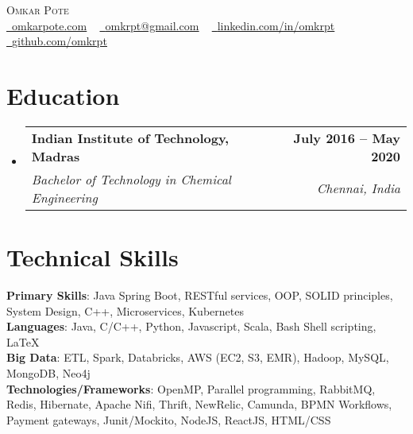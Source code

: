 \documentclass[letterpaper,11pt]{article}
\makeatletter
\newcommand{\resumeSubheading}[4]{
  \vspace{-2pt}\item
    \begin{tabular*}{1.0\textwidth}[t]{l@{\extracolsep{\fill}}r}
      \textbf{#1} & \textbf{\small #2} \\
      \textit{\small#3} & \textit{\small #4} \\
    \end{tabular*}\vspace{-7pt}
}
\newcommand{\resumeSubHeadingListStart}{\begin{itemize}[leftmargin=0.0in, label={}]}
\newcommand{\resumeSubHeadingListEnd}{\end{itemize}}
\makeatother
\begin{document}

\begin{center}
    {\vspace*{30pt} \Huge \scshape Omkar Pote} \\ \vspace{5pt} 
    \small
    \href{https://omkarpote.com}{\raisebox{-0.2\height}\faGlobe\  \underline{omkarpote.com}} ~ 
    \href{mailto:omkrpt@gmail.com}{\raisebox{-0.2\height}\faEnvelope\  \underline{omkrpt@gmail.com}} ~ 
    \href{https://linkedin.com/in/omkrpt/}{\raisebox{-0.2\height}\faLinkedin\ \underline{linkedin.com/in/omkrpt}}  ~
    \href{https://github.com/omkrpt}{\raisebox{-0.2\height}\faGithub\ \underline{github.com/omkrpt}}
    \vspace{-8pt}
\end{center}


\section{Education}
  \resumeSubHeadingListStart
    \resumeSubheading
      {Indian Institute of Technology, Madras}{July 2016 -- May 2020}
      {Bachelor of Technology in Chemical Engineering}{Chennai, India}
  \resumeSubHeadingListEnd

\section{Technical Skills}
 \begin{itemize}[leftmargin=0.15in, label={}]
    \small{\item{
     \textbf{Primary Skills}{: Java Spring Boot, RESTful services, OOP, SOLID principles, System Design, C++, Microservices, Kubernetes} \\
     \textbf{Languages}{: Java, C/C++, Python, Javascript, Scala, Bash Shell scripting, LaTeX} \\
     \textbf{Big Data}{: ETL, Spark, Databricks, AWS (EC2, S3, EMR), Hadoop, MySQL, MongoDB, Neo4j} \\
     \textbf{Technologies/Frameworks}{: OpenMP, Parallel programming, RabbitMQ, Redis, Hibernate, Apache Nifi, Thrift, NewRelic, Camunda, BPMN Workflows, Payment gateways, Junit/Mockito, NodeJS, ReactJS, HTML/CSS} \\
    }}
 \end{itemize}
 \vspace{-16pt}
\end{document}
